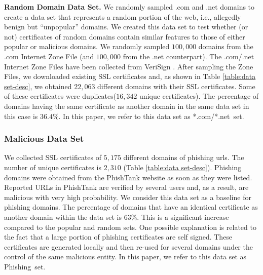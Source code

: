 \documentclass[twocolumn]{article}
\newcommand{\descr}[1]{\bigskip \noindent \textbf{#1}}
\newcommand{\phishing}{\textsf{Phishing}}
\newcommand{\comnet}{\textsf{*.com/*.net}}
\begin{document}
\descr{Random Domain Data Set.}
We randomly sampled .com and .net domains to create a data set that represents a random portion of 
the web, i.e., allegedly benign but ``unpopular'' domains. We 
created this data set to test whether (or not) certificates of random domains contain similar features to those of either popular 
or malicious domains. We randomly sampled $100,000$ domains from the .com Internet Zone File (and $100,000$ from the .net counterpart).
The .com/.net Internet Zone Files have been collected from VeriSign \cite{verisignurl}. After sampling the Zone Files, we downloaded 
existing SSL certificates and, as shown in Table \ref{table:data set-desc}, we obtained $22,063$ different domains 
with their SSL certificates. Some of these certificates were duplicates($16,342$ unique certificates). The 
percentage of domains having the same certificate as another domain in the same data set in this case is $36.4\%$. In this paper, we 
refer to this data set as \comnet\ set.


\subsubsection{Malicious Data Set}
 We collected SSL certificates of $5,175$ different domains of phishing urls. The number of 
unique certificates is $2,310$ (Table \ref{table:data set-desc}). Phishing domains were obtained from the PhishTank 
website \cite{phishtank} as soon as they were listed. Reported
URLs in PhishTank are verified by several users and, as a result, are malicious with very high
probability. We consider this data set as a baseline for phishing domains. The percentage of domains that have an identical certificate as another 
domain within the data set is $63\%$. This is a significant increase compared to the popular and random sets. One possible explanation 
is related to the fact that a large portion of phishing certificates are self signed. These 
certificates are generated locally and then re-used for several domains under the control of the same 
malicious entity. In this paper, we refer to this data set as \phishing\ set. 
\end{document}
